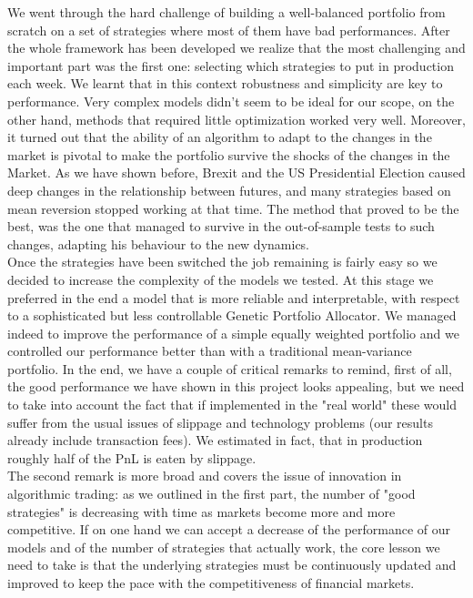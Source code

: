 We went through the hard challenge of building a well-balanced portfolio from scratch on a set of strategies where most of them have bad performances. After the whole framework has been developed we realize that the most challenging and important part was the first one: selecting which strategies to put in production each week. We learnt that in this context robustness and simplicity are key to performance. Very complex models didn't seem to be ideal for our scope, on the other hand, methods that required little optimization worked very well. Moreover, it turned out that the ability of an algorithm to adapt to the changes in the market is pivotal to make the portfolio survive the shocks of the changes in the Market. As we have shown before, Brexit and the US Presidential Election caused deep changes in the relationship between futures, and many strategies based on mean reversion stopped working at that time. The method that proved to be the best, was the one that managed to survive in the out-of-sample tests to such changes, adapting his behaviour to the new dynamics.\\
Once the strategies have been switched the job remaining is fairly easy so we decided to increase the complexity of the models we tested. At this stage we preferred in the end a model that is more reliable and interpretable, with respect to a sophisticated but less controllable Genetic Portfolio Allocator. We managed indeed to improve the performance of a simple equally weighted portfolio and we controlled our performance better than with a traditional mean-variance portfolio. In the end, we have a couple of critical remarks to remind, first of all, the good performance we have shown in this project looks appealing, but we need to take into account the fact that if implemented in the "real world" these would suffer from the usual issues of slippage and technology problems (our results already include transaction fees). We estimated in fact, that in production roughly half of the PnL is eaten by slippage.\\
The second remark is more broad and covers the issue of innovation in algorithmic trading: as we outlined in the first part, the number of "good strategies" is decreasing with time as markets become more and more competitive. If on one hand we can accept a decrease of the performance of our models and of the number of strategies that actually work, the core lesson we need to take is that the underlying strategies must be continuously updated and improved to keep the pace with the competitiveness of financial markets. 

